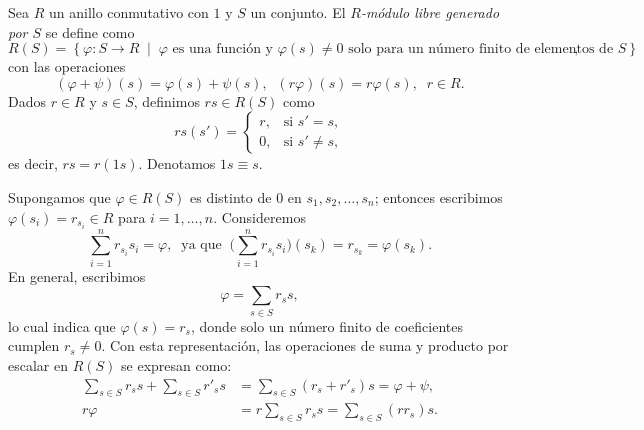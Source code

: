 \begin{definicion}
Sea $R$ un anillo conmutativo con $1$ y $S$ un conjunto. El \textit{$R$-módulo libre generado por $S$} se define como
\[
R(S) = \left\{ \varphi \colon S \to R \;\middle|\; \varphi \text{ es una función y } \varphi(s) \neq 0 \text{ solo para un número finito de elementos de } S \right\},
\]
con las operaciones
\[
(\varphi + \psi)(s) = \varphi(s) + \psi(s), \;\; (r\varphi)(s) = r\varphi(s), \;\; r \in R.
\]
Dados $r \in R$ y $s \in S$, definimos $rs \in R(S)$ como
\[
rs(s') = 
\begin{cases}
    r, & \text{si } s' = s, \\
    0, & \text{si } s' \neq s,
\end{cases}
\]
es decir, $rs = r(1s)$. Denotamos ${1s \equiv s}$.
\end{definicion}
Supongamos que $\varphi \in R(S)$ es distinto de $0$ en $s_1, s_2, \dots, s_n$; entonces escribimos $\varphi(s_i) = r_{s_i} \in R$ para $i = 1, \dots, n$. Consideremos
\[
\sum_{i=1}^n r_{s_i} s_i = \varphi, \;\; \text{ya que} \;\; \Big( \sum_{i=1}^n r_{s_i} s_i \Big)(s_k) = r_{s_k} = \varphi(s_k).
\]
En general, escribimos
\[
\varphi = \sum_{s \in S} r_s s,
\]
lo cual indica que $\varphi(s) = r_s$, donde solo un número finito de coeficientes cumplen $r_s \neq 0$. Con esta representación, las operaciones de suma y producto por escalar en $R(S)$ se expresan como:
\begin{align*}
{\sum_{s \in S} r_s s} + {\sum_{s \in S} r'_s s} &= \sum_{s \in S} (r_s + r'_s)s = \varphi + \psi, \\[1.5ex]
r\varphi &= r \sum_{s \in S} r_s s = \sum_{s \in S} (rr_s)s.
\end{align*}

